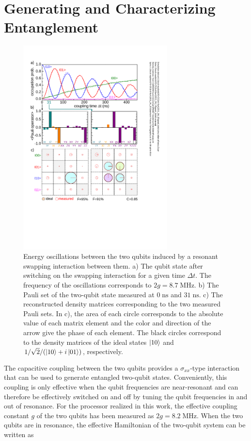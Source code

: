 \section{Generating and Characterizing Entanglement}

\begin{figure}
	\centering
		\includegraphics[width=0.7\textwidth]{./material/papers/iswap/submission1/Dewes_Figure2}
	\caption[Generating entangled two-qubit states by swapping interaction]{Energy oscillations between the two qubits induced by a resonant swapping interaction between them. a) The qubit state after switching on the swapping interaction for a given time $\Delta t$. The frequency of the oscillations corresponds to $2g = 8.7 \; \mathrm{MHz}$. b) The Pauli set of the two-qubit state measured at $0\; \mathrm{ns}$ and $31\; \mathrm{ns}$. c) The reconstructed density matrices corresponding to the two measured Pauli sets. In c), the area of each circle corresponds to the absolute value of each matrix element and the color and direction of the arrow give the phase of each element. The black circles correspond to the density matrices of the ideal states $\left| 10 \right>$ and $1/\sqrt{2}/(\left| 10 \right>+i\left| 01 \right>)$, respectively.}
	\label{fig:swap_interaction_state_tomography}
\end{figure}

The capacitive coupling between the two qubits provides a $\sigma_{xx}$-type interaction that can be used to generate entangled two-qubit states. Conveniently, this coupling is only effective when the qubit frequencies are near-resonant and can therefore be effectively switched on and off by tuning the qubit frequencies in and out of resonance. For the processor realized in this work, the effective coupling constant $g$ of the two qubits has been measured as $2g = 8.2 \; \mathrm{MHz}$. When the two qubits are in resonance, the effective Hamiltonian of the two-qubit system can be written as

